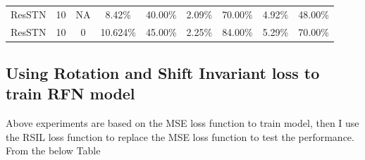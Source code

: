 \begin{table}[h]
\begin{tabular}{ccccccccc}
    \\
    ResSTN  & 10 &NA   & 8.42\%          & 40.00\%                                                                                  & 2.09\%          & 70.00\%                                                                                  & 4.92\% & 48.00\%      
    \\
    ResSTN & 10 &0   & 10.624\%          & 45.00\%                                                                                  & 2.25\%          & 84.00\%                                                                                  & 5.29\% & 70.00\%                                                                     \\ \hline
    \end{tabular}
    \label{stn}
\end{table}

\subsection{Using Rotation and Shift Invariant loss to train RFN model}
Above experiments are based on the MSE loss function to train model, then I use the RSIL loss function to replace the MSE loss function to test the performance. From the below Table

